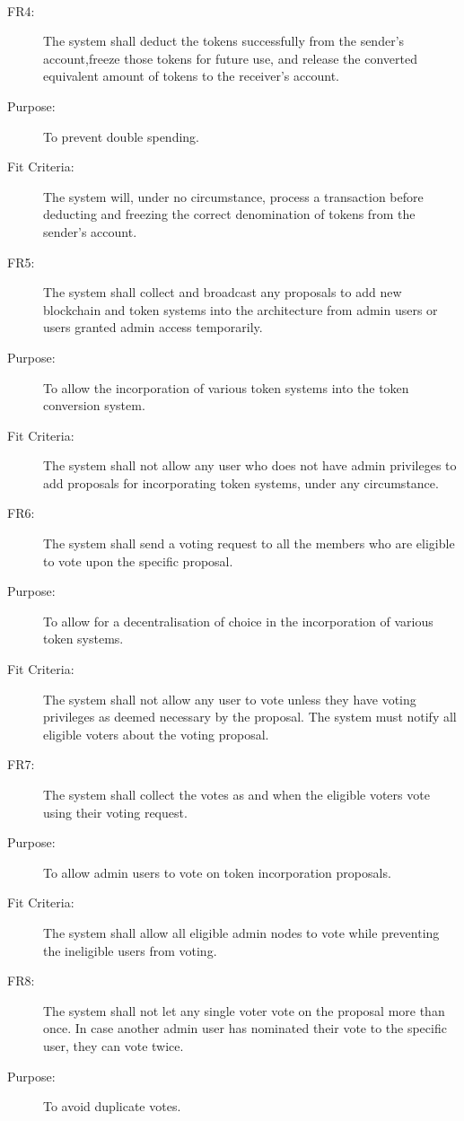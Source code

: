 \documentclass[a4paper,twoside,phd]{BYUPhys}
\begin{document}
\begin{description}
\\
\item[FR4:] The system shall deduct the tokens successfully from the sender’s account,freeze those tokens for future use, and release the converted equivalent amount of tokens to the receiver’s account.
\item[Purpose:] To prevent double spending.
\item[Fit Criteria:] The system will, under no circumstance, process a transaction before deducting and freezing the correct denomination of tokens from the sender's account.
\\
\item[FR5:] The system shall collect and broadcast any proposals to add new blockchain and token systems into the architecture from admin users or users granted admin access temporarily.
\item[Purpose:] To allow the incorporation of various token systems into the token conversion system.
\item[Fit Criteria:] The system shall not allow any user who does not have admin privileges to add proposals for incorporating token systems, under any circumstance.
\\
\item[FR6:] The system shall send a voting request to all the members who are eligible to vote upon the specific proposal.
\item[Purpose:] To allow for a decentralisation of choice in the incorporation of various token systems.
\item[Fit Criteria:] The system shall not allow any user to vote unless they have voting privileges as deemed necessary by the proposal. The system must notify all eligible voters about the voting proposal.
\\
\item[FR7:] The system shall collect the votes as and when the eligible voters vote using their voting request.
\item[Purpose:] To allow admin users to vote on token incorporation proposals.
\item[Fit Criteria:] The system shall allow all eligible admin nodes to vote while preventing the ineligible users from voting.
\\
\item[FR8:] The system shall not let any single voter vote on the proposal more than once. In case another admin user has nominated their vote to the specific user, they can vote twice.
\item[Purpose:] To avoid duplicate votes.

\end{description}
\end{document}
